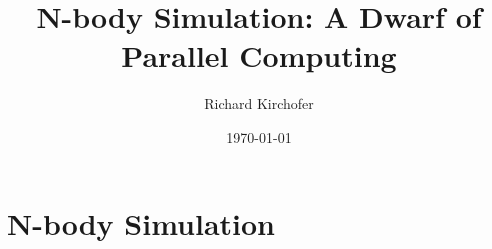 \documentclass[12pt]{article}
\title{N-body Simulation: A Dwarf of Parallel Computing}
\author{Richard Kirchofer}
\date{\today}
\begin{document}
\maketitle
\section{N-body Simulation}
\end{document}
